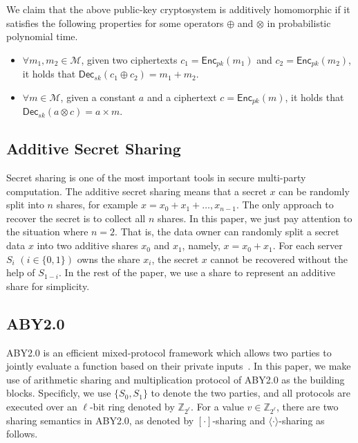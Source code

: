 \documentclass[conference]{IEEEtran}
\begin{document}
We claim that the above public-key cryptosystem is additively homomorphic if it satisfies the following properties for some operators $\oplus$ and $\otimes$ in probabilistic polynomial time.

\begin{itemize}
  \item $\forall m_1,m_2\in\mathcal{M}$, given two ciphertexts $c_1 = \mathsf{Enc}_{pk}(m_1)$ and $c_2 = \mathsf{Enc}_{pk}(m_2)$, it holds that $\mathsf{Dec}_{sk}(c_1 \oplus c_2) = m_1 + m_2$.
  \item $\forall m\in\mathcal{M}$, given a constant $a$ and a ciphertext $c=\mathsf{Enc}_{pk}(m)$, it holds that $\mathsf{Dec}_{sk}(a \otimes c) = a \times m$.
\end{itemize}

\subsection{Additive Secret Sharing}
Secret sharing is one of the most important tools in secure multi-party computation.
The additive secret sharing means that a secret $x$ can be randomly split into $n$ shares, for example $x = x_0 + x_1 + \ldots, x_{n-1}$.
The only approach to recover the secret is to collect all $n$ shares.
In this paper, we just pay attention to the situation where $n=2$.
That is, the data owner can randomly split a secret data $x$ into two additive shares $x_0$ and $x_1$, namely, $x = x_0 + x_1$.
For each server $S_i$ $(i\in\{0,1\})$ owns the share $x_i$, the secret $x$ cannot be recovered without the help of $S_{1-i}$.
In the rest of the paper, we use a share to represent an additive share for simplicity.

\iffalse
\subsection{ABY2.0}
ABY2.0 is an efficient mixed-protocol framework which allows two parties to jointly evaluate a function based on their private inputs~\cite{patra_aby20_2020}.
In this paper, we make use of arithmetic sharing and multiplication protocol of ABY2.0 as the building blocks.
Specificly, we use $\{S_0, S_1\}$ to denote the two parties, and all protocols are executed over an $\ell$-bit ring denoted by $\mathbb{Z}_{2^\ell}$.
For a value $v\in\mathbb{Z}_{2^\ell}$, there are two sharing semantics in ABY2.0, as denoted by $[\cdot]$-sharing and $\langle \cdot \rangle$-sharing as follows.
\end{document}
